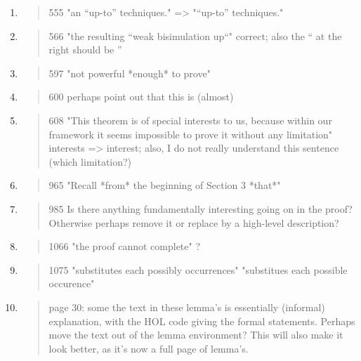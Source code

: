 \begin{enumerate}
  \item \begin{quote}
555 "an “up-to” techniques." => "“up-to” techniques."
\end{quote}
  \Mark

  \item \begin{quote}
566 "the resulting ``weak bisimulation up``" correct; also the `` at the right should be ''
\end{quote}
  \Mark

  \item \begin{quote}
597 "not powerful *enough* to prove" 
\end{quote}
  \Mark

  \item \begin{quote}
600 perhaps point out that this is (almost) 
\end{quote}
  \Mark

  \item \begin{quote}
608 "This theorem is of special interests to us, because within our framework it seems impossible to prove it without any limitation" interests => interest; also, I do not really understand this sentence (which limitation?)
\end{quote}
  \Mark

  \item \begin{quote}
965 "Recall *from* the beginning of Section 3 *that*"
\end{quote}
  \Mark

  \item \begin{quote}
985 Is there anything fundamentally interesting going on in the proof? Otherwise perhaps remove it or replace by a high-level description?
\end{quote}
  \Mark

  \item \begin{quote}
1066 "the proof cannot complete" ?
\end{quote}
  \Mark

  \item \begin{quote}
1075 "substitutes each possibly occurrences" "substitues each possible occurence"
\end{quote}
  \Mark

  \item \begin{quote}
page 30: some the text in these lemma's is essentially (informal) explanation, with the HOL code giving the formal statements. Perhaps move the text out of the lemma environment? This will also make it look better, as it's now a full page of lemma's. 
\end{quote}
  \Mark


\end{enumerate}
